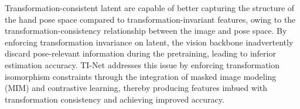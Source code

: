 
Transformation-consistent latent are capable of better capturing the structure of the hand pose space compared to transformation-invariant features, owing to the transformation-consistency relationship between the image and pose space. By enforcing transformation invariance on latent, the vision backbone inadvertently discard pose-relevant information during the pretraining, leading to inferior estimation accuracy. TI-Net addresses this issue by enforcing transformation isomorphism constraints through the integration of masked image modeling (MIM) and contrastive learning, thereby producing features imbued with transformation consistency and achieving improved accuracy.

